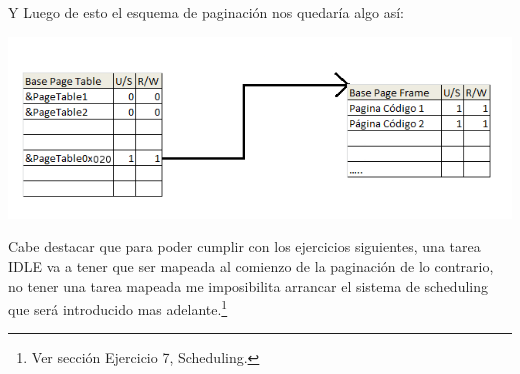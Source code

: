 Y Luego de esto el esquema de paginaci\'on nos quedar\'ia algo as\'i:

\includegraphics[scale=0.6]{imagenes/paginacionTareas.png}

Cabe destacar que para poder cumplir con los ejercicios siguientes, una tarea IDLE va a tener que ser mapeada al comienzo de la paginaci\'on
de lo contrario, no tener una tarea mapeada me imposibilita arrancar el sistema de scheduling que ser\'a introducido mas adelante.\footnote{Ver
secci\'on Ejercicio 7, Scheduling.}
